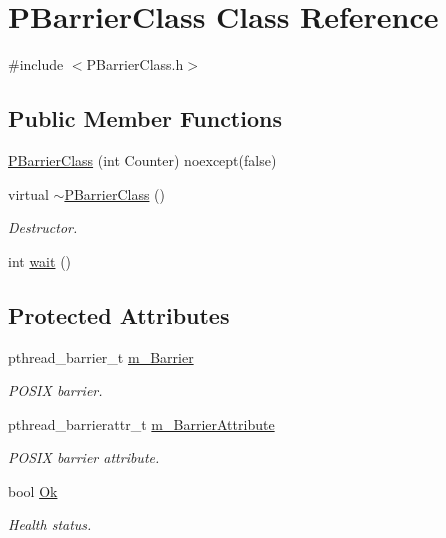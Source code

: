 \hypertarget{classPBarrierClass}{}\section{P\+Barrier\+Class Class Reference}
\label{classPBarrierClass}


{\ttfamily \#include $<$P\+Barrier\+Class.\+h$>$}

\subsection*{Public Member Functions}
\begin{DoxyCompactItemize}
\item 
\hyperlink{classPBarrierClass_ac10aa9da8e6abd94c8ea2f3ec16b0465}{P\+Barrier\+Class} (int Counter) noexcept(false)
\item 
virtual \hyperlink{classPBarrierClass_ae2b26bf61dbb556584701967d1769658}{$\sim$\+P\+Barrier\+Class} ()
\begin{DoxyCompactList}\small\item\em Destructor. \end{DoxyCompactList}\item 
int \hyperlink{classPBarrierClass_a7baf6225e2044591a1ef6f509d6dc1b1}{wait} ()
\end{DoxyCompactItemize}
\subsection*{Protected Attributes}
\begin{DoxyCompactItemize}
\item 
pthread\+\_\+barrier\+\_\+t \hyperlink{classPBarrierClass_a7ba33e81f5f045ff89f215077b562c60}{m\+\_\+\+Barrier}
\begin{DoxyCompactList}\small\item\em P\+O\+S\+IX barrier. \end{DoxyCompactList}\item 
pthread\+\_\+barrierattr\+\_\+t \hyperlink{classPBarrierClass_aef1dd3e10cedc850d14023d17b58d2a6}{m\+\_\+\+Barrier\+Attribute}
\begin{DoxyCompactList}\small\item\em P\+O\+S\+IX barrier attribute. \end{DoxyCompactList}\item 
bool \hyperlink{classPBarrierClass_a7413466ef1598d299dcc7bdc023e0414}{Ok}
\begin{DoxyCompactList}\small\item\em Health status. \end{DoxyCompactList}\end{DoxyCompactItemize}


